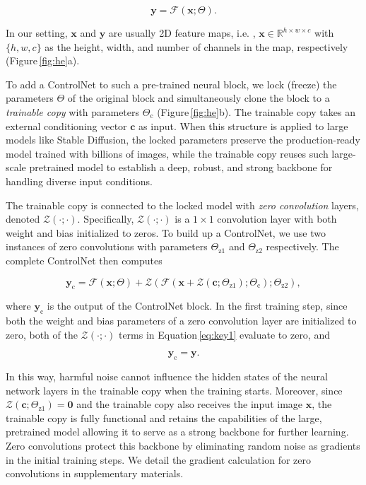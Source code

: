 \begin{equation}
		\bm{y}=\mathcal{F}(\bm{x};\Theta) .
	\end{equation}

	In our setting, $\bm{x}$ and $\bm{y}$ are usually 2D feature maps, i.e. , $\bm{x}\in\mathbb{R}^{h\times w \times c}$ with $\{h, w, c\}$
	as the height, width, and number of channels in the map, respectively (Figure\,\ref{fig:he}a). 

	To add a ControlNet to such a pre-trained neural block, we lock (freeze) the parameters $\Theta$ of the original block and simultaneously clone the block to a {\em trainable copy} with parameters $\Theta_\text{c}$
	(Figure\,\ref{fig:he}b).  The trainable copy takes an external conditioning vector $\bm{c}$ as input. When this structure is applied to large models like Stable Diffusion, the locked parameters preserve the production-ready model trained with billions of images, while the trainable copy reuses such large-scale pretrained model to establish a deep, robust, and strong backbone for handling diverse input conditions.

	The trainable copy is connected to the locked model with {\em zero convolution} layers, denoted 
	$\mathcal{Z}(\cdot;\cdot)$. Specifically,
	$\mathcal{Z}(\cdot;\cdot)$ is a $1\times 1$ convolution layer with both weight and bias initialized to zeros. To build up a ControlNet, we use two instances of zero convolutions with parameters $\Theta_\text{z1}$
	and $\Theta_\text{z2}$ respectively. The complete ControlNet then computes

\begin{equation}
		\label{eq:key1}
		\bm{y}_\text{c}=\mathcal{F}(\bm{x};\Theta)+\mathcal{Z}(\mathcal{F}(\bm{x}+\mathcal{Z}(\bm{c};\Theta_\text{z1});\Theta_\text{c});\Theta_\text{z2}),
	\end{equation}

	where $\bm{y}_\text{c}$ is the output of the ControlNet block. In the first training step, since both the weight and bias parameters of a zero convolution layer are initialized to zero, both of the $\mathcal{Z}(\cdot;\cdot)$ terms in Equation\,\eqref{eq:key1} evaluate to zero, and

\begin{equation}
		\label{key3}
		\bm{y}_\text{c} = \bm{y}.
	\end{equation}

	In this way, harmful noise cannot influence the hidden states of the neural network layers in the trainable copy when the training starts. Moreover, since $\mathcal{Z}(\bm{c};\Theta_\text{z1})=\bm{0}$ and the trainable copy also receives the input image $\bm{x}$, the trainable copy is fully functional and retains the capabilities of the large, pretrained model allowing it to serve as a strong backbone for further learning. Zero convolutions protect this backbone by eliminating random noise as gradients in the initial training steps. We detail the gradient calculation for zero convolutions in supplementary materials.

